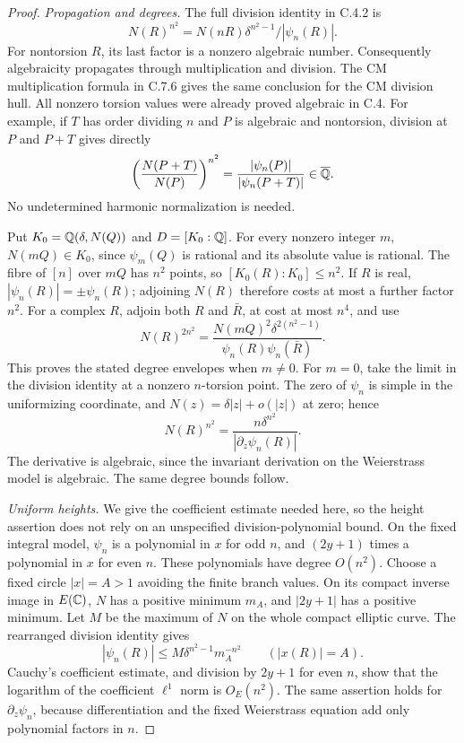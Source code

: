 \begin{proof}
\emph{Propagation and degrees.}
The full division identity in C.4.2 is
\[
 N(R)^{n^2}=N(nR)\delta^{n^2-1}/|\psi_n(R)|.
\]
For nontorsion $R$, its last factor is a nonzero algebraic number.
Consequently algebraicity propagates through multiplication
and division.  The CM multiplication formula in C.7.6 gives
the same conclusion for the CM division hull.  All nonzero
torsion values were already proved algebraic in C.4.
For example, if $T$ has order dividing $n$ and $P$ is algebraic
and nontorsion, division at $P$ and $P+T$ gives directly
\[
 \left(\frac{N(P+T)}{N(P)}\right)^{n^2}
       =\frac{|\psi_n(P)|}{|\psi_n(P+T)|}\in\overline{\mathbb Q}.
\]
No undetermined harmonic normalization is needed.

Put $K_0=\mathbb Q(\delta,N(Q))$ and $D=[K_0:\mathbb Q]$.
For every nonzero integer $m$, $N(mQ)\in K_0$, since
$\psi_m(Q)$ is rational and its absolute value is rational.
The fibre of $[n]$ over $mQ$ has $n^2$ points, so
$[K_0(R):K_0]\leq n^2$.
If $R$ is real, $|\psi_n(R)|=\pm\psi_n(R)$; adjoining
$N(R)$ therefore costs at most a further factor $n^2$.
For a complex $R$, adjoin both $R$ and $\bar R$, at cost
at most $n^4$, and use
\[
 N(R)^{2n^2}=
 \frac{N(mQ)^2\delta^{2(n^2-1)}}
      {\psi_n(R)\psi_n(\bar R)}.
\]
This proves the stated degree envelopes when $m\ne0$.
For $m=0$, take the limit in the division identity at a nonzero
$n$-torsion point.  The zero of $\psi_n$ is simple in the
uniformizing coordinate, and $N(z)=\delta|z|+o(|z|)$ at zero;
hence
\[
 N(R)^{n^2}=
       \frac{n\delta^{n^2}}{|\partial_z\psi_n(R)|}.
\]
The derivative is algebraic, since the invariant derivation on
the Weierstrass model is algebraic.  The same degree bounds follow.

\emph{Uniform heights.}
We give the coefficient estimate needed here, so the height
assertion does not rely on an unspecified division-polynomial
bound.  On the fixed integral model, $\psi_n$ is a polynomial
in $x$ for odd $n$, and $(2y+1)$ times a polynomial in $x$
for even $n$.  These polynomials have degree $O(n^2)$.
Choose a fixed circle $|x|=A>1$ avoiding the finite branch values.
On its compact inverse image in $E(\mathbb C)$, $N$ has a positive
minimum $m_A$, and $|2y+1|$ has a positive minimum.  Let $M$
be the maximum of $N$ on the whole compact elliptic curve.
The rearranged division identity gives
\[
 |\psi_n(R)|\leq M\delta^{n^2-1}m_A^{-n^2}
       \qquad(|x(R)|=A).
\]
Cauchy's coefficient estimate, and division by $2y+1$ for
even $n$, show that the logarithm of the coefficient
$\ell^1$ norm is $O_E(n^2)$.  The same assertion holds for
$\partial_z\psi_n$, because differentiation and the fixed
Weierstrass equation add only polynomial factors in $n$.


\end{proof}
